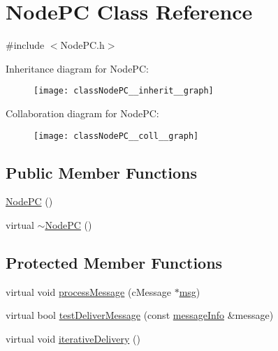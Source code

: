 \hypertarget{classNodePC}{}\section{Node\+PC Class Reference}
\label{classNodePC}


{\ttfamily \#include $<$Node\+P\+C.\+h$>$}



Inheritance diagram for Node\+PC\+:\nopagebreak
\begin{figure}[H]
\begin{center}
\leavevmode
\texttt{[image: classNodePC\_\_inherit\_\_graph]}
\end{center}
\end{figure}


Collaboration diagram for Node\+PC\+:\nopagebreak
\begin{figure}[H]
\begin{center}
\leavevmode
\texttt{[image: classNodePC\_\_coll\_\_graph]}
\end{center}
\end{figure}
\subsection*{Public Member Functions}
\begin{DoxyCompactItemize}
\item 
\hyperlink{classNodePC_a0b937d3f3d409fd1a8d1c15170d97675}{Node\+PC} ()
\item 
virtual \hyperlink{classNodePC_a823ec7244202157115f6d587c0c565dc}{$\sim$\+Node\+PC} ()
\end{DoxyCompactItemize}
\subsection*{Protected Member Functions}
\begin{DoxyCompactItemize}
\item 
virtual void \hyperlink{classNodePC_aa5fedc4136104a06e2f1131f1ba16b0e}{process\+Message} (c\+Message $\ast$\hyperlink{Controller_8h_afa0f3b802fbc219228f7bb97996fa558}{msg})
\item 
virtual bool \hyperlink{classNodePC_a54731196935596e0c6f094a5a8420134}{test\+Deliver\+Message} (const \hyperlink{structures_8h_a7e7bdc1d2fff8a9436f2f352b2711ed6}{message\+Info} \&message)
\item 
virtual void \hyperlink{classNodePC_a7ac363db597ebadd3b18dd4343440aa1}{iterative\+Delivery} ()
\end{DoxyCompactItemize}

